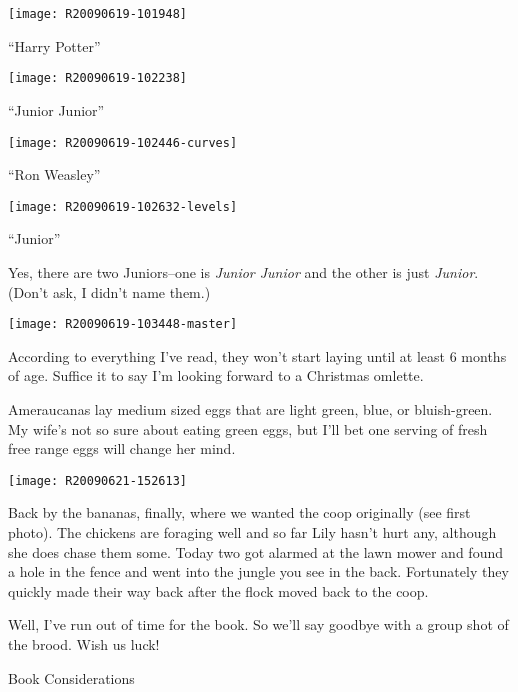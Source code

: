 \texttt{[image: R20090619-101948]}

\begin{center}{\Large ``Harry Potter'' }\end{center}
\newpage

\texttt{[image: R20090619-102238]}

\begin{center}{\Large ``Junior Junior'' }\end{center}
\newpage

\texttt{[image: R20090619-102446-curves]}

\begin{center}{\Large ``Ron Weasley'' }\end{center}
\newpage

\texttt{[image: R20090619-102632-levels]}

\begin{center}{\Large ``Junior'' }\end{center}

Yes, there are two Juniors--one is {\em Junior Junior} and the other
is just {\em Junior}. (Don't ask, I didn't name them.) 
\newpage

\texttt{[image: R20090619-103448-master]}

According to everything I've read, they won't start laying until at
least 6 months of age. Suffice it to say I'm looking forward to a
Christmas omlette. 

Ameraucanas lay medium sized eggs that are light green, blue, or
bluish-green. My wife's not so sure about eating green eggs, but I'll
bet one serving of fresh free range eggs will change her mind.
\newpage

\texttt{[image: R20090621-152613]}

Back by the bananas, finally, where we wanted the coop originally (see
first photo). The chickens are foraging well and so far Lily hasn't hurt
any, although she does chase them some. Today two got alarmed at the
lawn mower and found a hole in the fence and went into the jungle you
see in the back. Fortunately they quickly made their way back after the
flock moved back to the coop. 

Well, I've run out of time for the book. So we'll say goodbye with a
group shot of the brood. Wish us luck! 
\newpage

\vspace*{1in}

{\LARGE Book Considerations}

